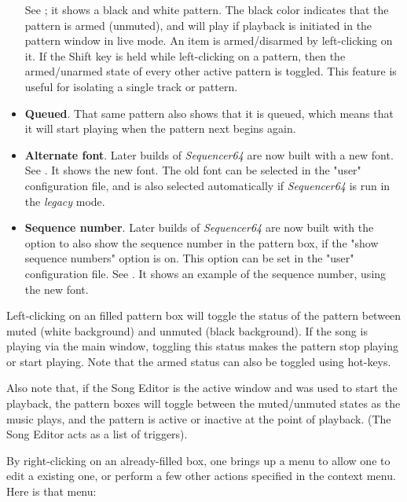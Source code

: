 \begin{itemize}
         See ; it shows a black
         and white pattern.  The black color indicates that the pattern is armed
         (unmuted), and will play if playback is initiated in the pattern
         window in live mode.
         An item is armed/disarmed by left-clicking on it.
         If the Shift key is held while left-clicking on a pattern, then
         the armed/unarmed state of every other active pattern is toggled.
         This feature is useful for isolating a single track or pattern.
      \item \textbf{Queued}.
         That same pattern also shows that it is queued, which means that it
         will start playing when the pattern next begins again.
      \item \textbf{Alternate font}.
         Later builds of \textsl{Sequencer64} are now built with a new font.
         See .  It shows the new
         font. 
         The old font can be selected in the "user" configuration file, and is
         also selected automatically if \textsl{Sequencer64} is run in the
         \textsl{legacy} mode.
      \item \textbf{Sequence number}.
         Later builds of \textsl{Sequencer64} are now built with the option to
         also show the sequence number in the pattern box, if the "show
         sequence numbers" option is on.
         This option can be set in the "user" configuration file.
         See .  It shows an
         example of the sequence number, using the new font.
   \end{itemize}

   Left-clicking on an filled pattern box will toggle the status of the
   pattern between muted (white background) and unmuted (black background).
   If the song is playing via the main window, toggling this status makes
   the pattern stop playing or start playing.  Note that the armed status
   can also be toggled using hot-keys.

   Also note that, if the Song Editor is the active window and was used to
   start the playback, the pattern boxes will toggle between the muted/unmuted
   states as the music plays, and the pattern is active or inactive at the
   point of playback.  (The Song Editor acts as a list of triggers).

   By right-clicking on an already-filled box, one brings up a menu
   to allow one to edit a existing one, or perform a few other actions
   specified in the context menu.  Here is that menu:

